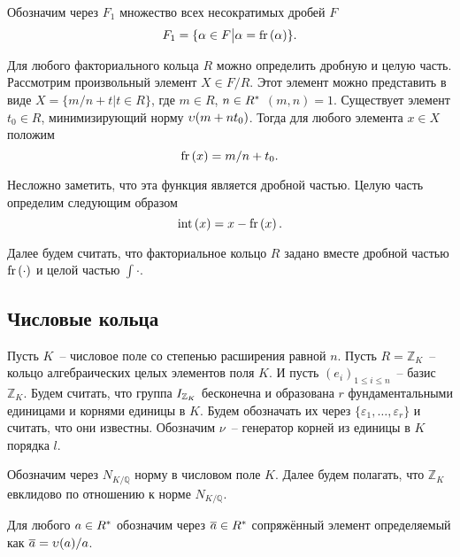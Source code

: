 \documentclass[_00_autoref.tex]{subfiles}
\begin{document}
\begin{definition}
    Обозначим через $F_1$ множество всех несократимых дробей $F$
    \begin{equation*}
        F_1 = \{
            \alpha \in F \big| \alpha = \textrm{fr}\left(\alpha\right)
        \}.
    \end{equation*}
\end{definition}

\begin{remark}\label{remark:easy_fr}
    Для любого факториального кольца $R$ можно определить дробную и целую часть.
    Рассмотрим произвольный элемент $X \in F/R$.
    Этот элемент можно представить в виде $X = \{m/n + t | t \in R\}$, где $m \in R$, $n \in R^{*}$ $(m, n) = 1$.
    Существует элемент $t_0 \in R$, минимизирующий норму $\upsilon(m + n t_0)$.
    Тогда для любого элемента $x \in X$ положим
    \begin{equation*}
        \textrm{fr}\left(x\right) = m/n + t_0.
    \end{equation*}

    Несложно заметить, что эта функция является дробной частью.
    Целую часть определим следующим образом
    \begin{equation*}
        \textrm{int}\left(x\right) = x - \textrm{fr}\left(x\right).
    \end{equation*}
\end{remark}

Далее будем считать, что факториальное кольцо $R$ задано вместе дробной частью $\textrm{fr}\left(\cdot\right)$ и целой частью $\int{\cdot}$.

\subsection{Числовые кольца}

Пусть $K$~-- числовое поле со степенью расширения равной $n$.
Пусть $R = \mathbb{Z}_K$~-- кольцо алгебраических целых элементов поля $K$.
И пусть $(e_i)_{1 \le i \le n}$~-- базис $\mathbb{Z}_K$.
Будем считать, что группа $I_{\mathbb{Z}_K}$ бесконечна и образована $r$ фундаментальными единицами и корнями единицы в $K$.
Будем обозначать их через $\{\varepsilon_1, \dots, \varepsilon_r\}$ и считать, что они известны.
Обозначим $\nu$~-- генератор корней из единицы в $K$ порядка $l$.

Обозначим через $N_{K/\mathbb{Q}}$ норму в числовом поле $K$.
Далее будем полагать, что $\mathbb{Z}_K$ евклидово по отношению к норме $N_{K/\mathbb{Q}}$.

\begin{definition}
    Для любого $a \in R^{*}$ обозначим через $\overline{a} \in R^{*}$ сопряжённый элемент определяемый как $\overline{a} = \upsilon(a)/a$.
\end{definition}
\end{document}
